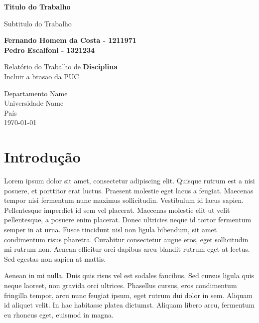 \documentclass[12pt, a4paper]{article}
\begin{document}
\begin{titlepage}
	\begin{center}
		\vspace*{1cm}

		\Huge
		\textbf{Titulo do Trabalho}

		\vspace{0.5cm}
		\Large
		Subtitulo do Trabalho

		\vspace{1.5cm}

		\normalsize
		\textbf{Fernando Homem da Costa - 1211971}\\
		\textbf{Pedro Escalfoni - 1321234}

		\vfill
		Relatório do Trabalho de \textbf{Disciplina} \\

		\vspace{0.8cm}
		Incluir a brasao da PUC

		\Large
		Departamento Name\\
		Universidade Name\\
		País\\
		\today

	\end{center}
\end{titlepage}

\tableofcontents

\newpage

\section{Introdução}
Lorem ipsum dolor sit amet, consectetur adipiscing elit. Quisque rutrum est a nisi posuere, et porttitor erat luctus. Praesent molestie eget lacus a feugiat. Maecenas tempor nisi fermentum nunc maximus sollicitudin. Vestibulum id lacus sapien. Pellentesque imperdiet id sem vel placerat. Maecenas molestie elit ut velit pellentesque, a posuere enim placerat. Donec ultricies neque id tortor fermentum semper in at urna. Fusce tincidunt nisl non ligula bibendum, sit amet condimentum risus pharetra. Curabitur consectetur augue eros, eget sollicitudin mi rutrum non. Aenean efficitur orci dapibus arcu blandit rutrum eget at lectus. Sed egestas non sapien at mattis.

Aenean in mi nulla. Duis quis risus vel est sodales faucibus. Sed cursus ligula quis neque laoreet, non gravida orci ultrices. Phasellus cursus, eros condimentum fringilla tempor, arcu nunc feugiat ipsum, eget rutrum dui dolor in sem. Aliquam id aliquet velit. In hac habitasse platea dictumst. Aliquam libero arcu, fermentum eu rhoncus eget, euismod in magna.
\end{document}
